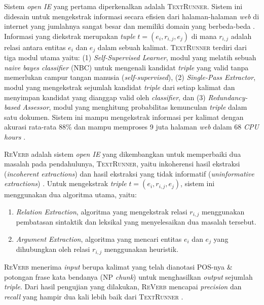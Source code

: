 Sistem \textit{open IE} yang pertama diperkenalkan adalah \textsc{TextRunner}. Sistem ini didesain untuk mengekstrak informasi secara efisien dari halaman-halaman \textit{web} di internet yang jumlahnya sangat besar dan memiliki domain yang berbeda-beda \citep{banko2007open}. Informasi yang diekstrak merupakan \textit{tuple} $t = (e_i, r_{i,j}, e_j)$ di mana $r_{i,j}$ adalah relasi antara entitas $e_i$ dan $e_j$ dalam sebuah kalimat. \textsc{TextRunner} terdiri dari tiga modul utama \citep{banko2007open} yaitu: (1) \textit{Self-Supervised Learner}, modul yang melatih sebuah \textit{naive bayes classifier} (NBC) untuk mengenali kandidat \textit{triple} yang valid tanpa memerlukan campur tangan manusia (\textit{self-supervised}), (2) \textit{Single-Pass Extractor}, modul yang mengekstrak sejumlah kandidat \textit{triple} dari setiap kalimat dan menyimpan kandidat yang dianggap valid oleh \textit{classifier}, dan (3) \textit{Redundancy-based Assessor}, modul yang menghitung probabilitas kemunculan \textit{triple} dalam satu dokumen. Sistem ini mampu mengekstrak informasi per kalimat dengan akurasi rata-rata 88\% dan mampu memproses 9 juta halaman \textit{web} dalam 68 \textit{CPU hours} \citep{banko2007open}.

\textsc{ReVerb} adalah sistem \textit{open IE} yang dikembangkan untuk memperbaiki dua masalah pada pendahulunya, \textsc{TextRunner}, yaitu inkoherensi hasil ekstraksi (\textit{incoherent extractions}) dan hasil ekstraksi yang tidak informatif (\textit{uninformative extractions}) \citep{fader2011identifying}. Untuk mengekstrak \textit{triple} $t = (e_i, r_{i,j}, e_j)$, sistem ini menggunakan dua algoritma utama, yaitu:

\begin{enumerate}
	\item \textit{Relation Extraction}, algoritma yang mengekstrak relasi $r_{i,j}$ menggunakan pembatasan sintaktik dan leksikal yang menyelesaikan dua masalah tersebut.
	\item \textit{Argument Extraction}, algoritma yang mencari entitas $e_i$ dan $e_j$ yang dihubungkan oleh relasi $r_{i,j}$ menggunakan heuristik. 
\end{enumerate}

\textsc{ReVerb} menerima \textit{input} berupa kalimat yang telah dianotasi POS-nya \& potongan frase kata bendanya (NP \textit{chunk}) untuk menghasilkan \textit{output} sejumlah \textit{triple}. Dari hasil pengujian yang dilakukan, \textsc{ReVerb} mencapai \textit{precision} dan \textit{recall} yang hampir dua kali lebih baik dari \textsc{TextRunner} \citep{fader2011identifying}.

